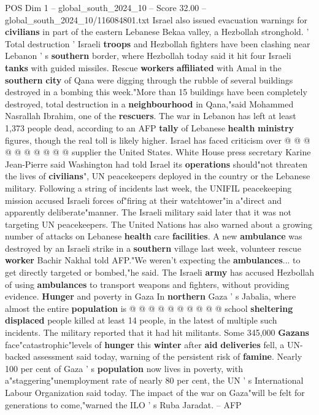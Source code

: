 \begin{textsample}{POS Dim 1 – global\_south\_2024\_10 – Score 32.00 – global\_south\_2024\_10/116084801.txt}
Israel also issued evacuation warnings for \textbf{civilians} in part of the eastern Lebanese Bekaa valley, a Hezbollah stronghold. ' Total destruction ' Israeli \textbf{troops} and Hezbollah fighters have been clashing near Lebanon ' s \textbf{southern} border, where Hezbollah today said it hit four Israeli \textbf{tanks} with guided missiles.
Rescue \textbf{workers} \textbf{affiliated} with Amal in the \textbf{southern} \textbf{city} of Qana were digging through the rubble of several buildings destroyed in a bombing this week."More than 15 buildings have been completely destroyed, total destruction in a \textbf{neighbourhood} in Qana,"said Mohammed Nasrallah Ibrahim, one of the \textbf{rescuers}.
The war in Lebanon has left at least 1,373 people dead, according to an AFP \textbf{tally} of Lebanese \textbf{health} \textbf{ministry} figures, though the real toll is likely higher.
Israel has faced criticism over @ @ @ @ @ @ @ @ @ @ supplier the United States.
White House press secretary Karine Jean-Pierre said Washington had told Israel its \textbf{operations} should"not threaten the lives of \textbf{civilians}", UN peacekeepers deployed in the country or the Lebanese military.
Following a string of incidents last week, the UNIFIL peacekeeping mission accused Israeli forces of"firing at their watchtower"in a"direct and apparently deliberate"manner.
The Israeli military said later that it was not targeting UN peacekeepers.
The United Nations has also warned about a growing number of attacks on Lebanese \textbf{health} care \textbf{facilities}.
A new \textbf{ambulance} was destroyed by an Israeli strike in a \textbf{southern} village last week, volunteer rescue \textbf{worker} Bachir Nakhal told AFP."We weren't expecting the \textbf{ambulances}... to get directly targeted or bombed,"he said.
The Israeli \textbf{army} has accused Hezbollah of using \textbf{ambulances} to transport weapons and fighters, without providing evidence. \textbf{Hunger} and poverty in Gaza In \textbf{northern} Gaza ' s Jabalia, where almost the entire \textbf{population} is @ @ @ @ @ @ @ @ @ @ school \textbf{sheltering} \textbf{displaced} people killed at least 14 people, in the latest of multiple such incidents.
The military reported that it had hit militants.
Some 345,000 \textbf{Gazans} face"catastrophic"levels of \textbf{hunger} this \textbf{winter} after \textbf{aid} \textbf{deliveries} fell, a UN-backed assessment said today, warning of the persistent risk of \textbf{famine}.
Nearly 100 per cent of Gaza ' s \textbf{population} now lives in poverty, with a"staggering"unemployment rate of nearly 80 per cent, the UN ' s International Labour Organization said today.
The impact of the war on Gaza"will be felt for generations to come,"warned the ILO ' s Ruba Jaradat. -- AFP

\end{textsample}
